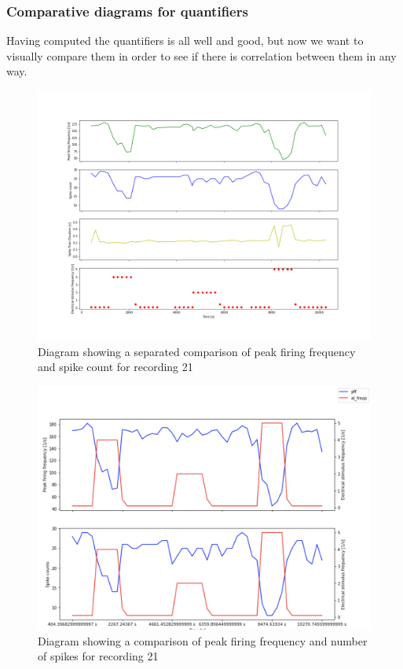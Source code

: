 \subsubsection{Comparative diagrams for quantifiers}
Having computed the quantifiers is all well and good, but now we want to visually compare them in order to see if there is correlation between them in any way.
\begin{figure}
	\includegraphics[width = \textwidth]{src/pic/11_12_13_sp}
	\caption{Diagram showing a separated comparison of peak firing frequency and spike count for recording 21}
	\label{fig:quantcomp_sp}
\end{figure}
\begin{figure}
	\includegraphics[width = \textwidth]{src/pic/11_12_13_cm}
	\caption{Diagram showing a comparison of peak firing frequency and number of spikes for recording 21}
	\label{fig:quantcomp_cm}
\end{figure}


